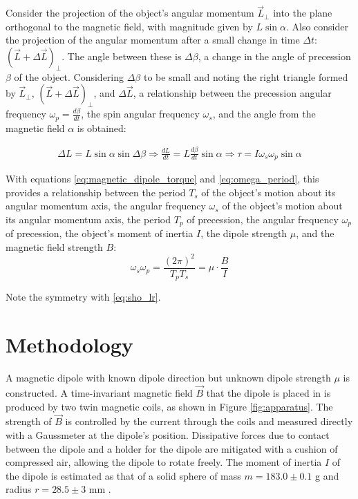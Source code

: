 \documentclass[11pt]{article}
\begin{document}
\vspace{1em}


Consider the projection of the object's angular momentum $\vec
L_\perp$ into the plane orthogonal to the magnetic field, with magnitude
given by $L \sin \alpha$. Also consider the projection
of the angular momentum after a small change in time $\Delta t$:
$(\vec L + \Delta \vec L)_\perp$. The angle between these is $\Delta
\beta$, a change in the angle of precession $\beta$ of the object. Considering
$\Delta \beta$ to be small and noting the right triangle formed by
$\vec L_\perp$, $(\vec L + \Delta \vec L)_\perp$, and $\Delta \vec L$, a
relationship between the precession
angular frequency $\omega_p = \frac{d\beta}{dt}$, the spin angular
frequency $\omega_s$, and the angle from the magnetic field $\alpha$
is obtained:

\begin{align}
  \Delta L = L \sin \alpha \sin \Delta \beta
  \Rightarrow \frac{dL}{dt} = L \frac{d\beta}{dt} \sin \alpha
  \Rightarrow \tau = I \omega_s \omega_p \sin \alpha
\end{align}

With equations \eqref{eq:magnetic_dipole_torque} and
\eqref{eq:omega_period}, this provides a relationship between the
period $T_s$ of the object's motion about its angular
momentum axis, the angular frequency $\omega_s$ of the object's motion
about its angular momentum axis, the period $T_p$ of
precession, the angular frequency $\omega_p$ of precession, the
object's moment of inertia $I$, the dipole strength
$\mu$, and the magnetic field strength $B$:
\begin{equation}
  \omega_s \omega_p =
  \frac{(2 \pi)^2}{T_pT_s} = \mu \cdot \frac{B}{I}
  \label{eq:prec_lr}
\end{equation}

Note the symmetry with \eqref{eq:sho_lr}.

\section{Methodology}

A magnetic dipole with known dipole direction but unknown dipole
strength $\mu$ is constructed. A
time-invariant magnetic field $\vec B$ that the dipole is placed
in is produced by two twin magnetic coils, as shown in Figure
\ref{fig:apparatus}. The strength of $\vec B$ is
controlled by the current through the coils \cite{young} and measured directly
with a Gaussmeter at the
dipole's position. Dissipative forces due to contact between the
dipole and a holder for the dipole are mitigated with a cushion of
compressed air,
allowing the dipole to
rotate freely. The moment of inertia $I$ of the dipole is estimated as that
of a solid sphere of mass $m = 183.0 \pm 0.1$ g and radius $r = 28.5
\pm 3$ mm \cite{young}.
\end{document}
